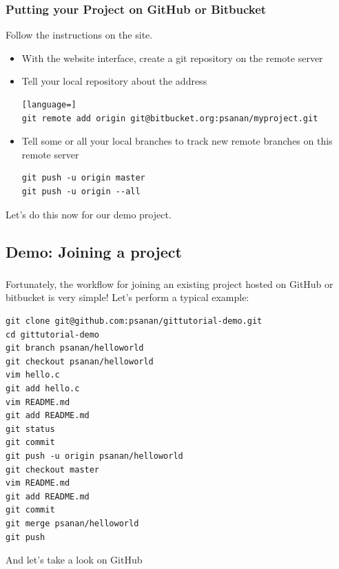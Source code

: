 \documentclass{beamer}
\begin{document}
\begin{frame}[fragile]
\frametitle{Putting your Project on GitHub or Bitbucket}
Follow the instructions on the site.
\begin{itemize}
\item With the website interface, create a git repository on the remote server
\item Tell your local repository about the address
\begin{lstlisting}[language=]
git remote add origin git@bitbucket.org:psanan/myproject.git
\end{lstlisting}
\item Tell some or all your local branches to track new remote branches on this remote server
\begin{lstlisting}
git push -u origin master
git push -u origin --all
\end{lstlisting}
\end{itemize}

Let's do this now for our demo project.

\end{frame}

\subsection{Demo: Joining a project}

\begin{frame}[fragile]
\frametitle{}
Fortunately, the workflow for joining an existing project hosted on GitHub or bitbucket is very simple!
Let's perform a typical example:
\begin{lstlisting}
git clone git@github.com:psanan/gittutorial-demo.git
cd gittutorial-demo
git branch psanan/helloworld
git checkout psanan/helloworld
vim hello.c
git add hello.c
vim README.md
git add README.md
git status
git commit
git push -u origin psanan/helloworld
git checkout master
vim README.md
git add README.md
git commit
git merge psanan/helloworld
git push
\end{lstlisting}
And let's take a look on GitHub
\end{frame}
\end{document}
